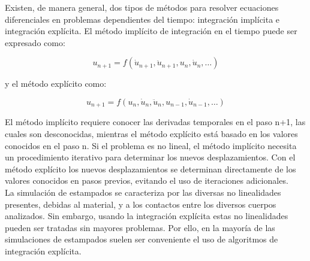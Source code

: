 Existen, de manera general, dos tipos de métodos para resolver ecuaciones diferenciales  
en problemas dependientes del tiempo: integración implícita e integración explícita. El 
método implícito de integración en el tiempo puede ser expresado como: ~\cite{nielsen1997}

\begin{equation}
u_{n+1}=f(\dot{u}_{n+1},\ddot{u}_{n+1},u_n,\dot{u}_n,…)
\end{equation}

y el método explícito como:

\begin{equation}
u_{n+1}=f(u_n,\dot{u}_n,\ddot{u}_n,u_{n-1},\dot{u}_{n-1},…)
\end{equation}

El método implícito requiere conocer las derivadas temporales en el paso n+1, las cuales son desconocidas, 
mientras el método explícito está basado en los valores conocidos en el paso n. Si el problema es no 
lineal, el método implícito necesita un procedimiento iterativo para determinar los nuevos desplazamientos. 
Con el método explícito los nuevos desplazamientos se determinan directamente de los valores conocidos 
en pasos previos, evitando el uso de iteraciones adicionales.~\cite{nielsen1997}\\

La simulación de estampados se caracteriza por las diversas no linealidades presentes, debidas al 
material, y a los contactos entre los diversos cuerpos analizados. Sin embargo, usando la integración 
explícita estas no linealidades pueden ser tratadas sin mayores problemas. Por ello, en la mayoría de 
las simulaciones de estampados suelen ser conveniente el uso de algoritmos de integración explícita.





